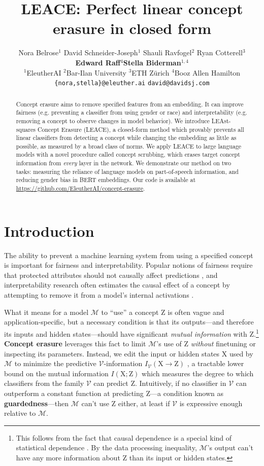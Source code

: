 \documentclass{article}
\title{LEACE: Perfect linear concept erasure in closed form}
\author{%
Nora Belrose$^1$ \quad David Schneider-Joseph$^1$ \quad Shauli Ravfogel$^2$ \quad Ryan Cotterell$^3$ \\ \textbf{Edward Raff}$^4$\quad \textbf{Stella Biderman}$^{1,4}$ \\
$^1$EleutherAI \quad $^2$Bar-Ilan University \quad $^3$ETH Zürich \quad $^4$Booz Allen Hamilton\\
\texttt{\{nora,stella\}@eleuther.ai} \quad \texttt{david@davidsj.com}
}
\theoremstyle{plain}
\theoremstyle{remark}
\theoremstyle{plain}
\theoremstyle{TheoremNum}
\newcommand{\rv}[1]{{\mathrm{#1}}}
\begin{document}
\maketitle


\begin{abstract}
Concept erasure aims to remove specified features from an embedding. It can improve fairness (e.g. preventing a classifier from using gender or race) and interpretability (e.g. removing a concept to observe changes in model behavior). We introduce LEAst-squares Concept Erasure (LEACE), a closed-form method which provably prevents all linear classifiers from detecting a concept while changing the embedding as little as possible, as measured by a broad class of norms. We apply LEACE to large language models with a novel procedure called concept scrubbing, which erases target concept information from \emph{every} layer in the network. We demonstrate our method on two tasks: measuring the reliance of language models on part-of-speech information, and reducing gender bias in BERT embeddings. Our code is available at \url{https://github.com/EleutherAI/concept-erasure}.
\end{abstract}

\section{Introduction}

The ability to prevent a machine learning system from using a specified concept is important for fairness and interpretability. 
Popular notions of fairness require that protected attributes should not causally affect predictions \cite{kusner2017counterfactual, nilforoshan2022causal}, and interpretability research often estimates the causal effect of a concept by attempting to remove it from a model's internal activations \cite{elazar2021amnesic, ravfogel2021counterfactual, nikoulina2021rediscovery, dankers2022can, hernandez2021low}.

What it means for a model $\mathcal M$ to ``use'' a concept $\rv Z$ is often vague and application-specific, but a necessary condition is that its outputs---and therefore its inputs and hidden states---should have significant \emph{mutual information} with $\rv Z$.\footnote{This follows from the fact that causal dependence is a special kind of statistical dependence \cite{pearl09causality}. By the data processing inequality, $\mathcal M$'s output can't have any more information about $\rv Z$ than its input or hidden states.} \textbf{Concept erasure} leverages this fact to limit $\mathcal M$'s use of $\rv Z$ \emph{without} finetuning or inspecting its parameters. Instead, we edit the input or hidden states $\rv X$ used by $\mathcal M$ to minimize the predictive $\mathcal V$-information $I_{\mathcal V}(\rv X \rightarrow \rv Z)$ \cite{xu2020theory}, a tractable lower bound on the mutual information $I(\rv X; \rv Z)$ which measures the degree to which classifiers from the family $\mathcal V$ can predict $\rv Z$. Intuitively, if no classifier in $\mathcal V$ can outperform a constant function at predicting $\rv Z$---a condition known as \textbf{guardedness}---then $\mathcal M$ can't use $\rv Z$ either, at least if $\mathcal V$ is expressive enough relative to $\mathcal M$.
\end{document}
